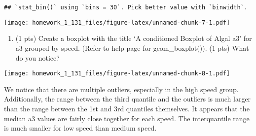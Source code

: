 \documentclass[
]{article}
\newenvironment{Shaded}{\begin{snugshade}}{\end{snugshade}}
\newcommand{\AttributeTok}[1]{\textcolor[rgb]{0.77,0.63,0.00}{#1}}
\newcommand{\CommentTok}[1]{\textcolor[rgb]{0.56,0.35,0.01}{\textit{#1}}}
\newcommand{\FunctionTok}[1]{\textcolor[rgb]{0.00,0.00,0.00}{#1}}
\newcommand{\NormalTok}[1]{#1}
\newcommand{\OtherTok}[1]{\textcolor[rgb]{0.56,0.35,0.01}{#1}}
\newcommand{\SpecialCharTok}[1]{\textcolor[rgb]{0.00,0.00,0.00}{#1}}
\newcommand{\StringTok}[1]{\textcolor[rgb]{0.31,0.60,0.02}{#1}}
\providecommand{\tightlist}{%
  \setlength{\itemsep}{0pt}\setlength{\parskip}{0pt}}
\begin{document}
\begin{verbatim}
## `stat_bin()` using `bins = 30`. Pick better value with `binwidth`.
\end{verbatim}

\texttt{[image: homework\_1\_131\_files/figure-latex/unnamed-chunk-7-1.pdf]}

\begin{enumerate}
\def\labelenumi{\alph{enumi}.}
\setcounter{enumi}{2}
\tightlist
\item
  (1 pts) Create a boxplot with the title `A conditioned Boxplot of
  Algal a3' for a3 grouped by speed. (Refer to help page for
  geom\_boxplot()). (1 pts) What do you notice?
\end{enumerate}

\begin{Shaded}
\end{Shaded}

\texttt{[image: homework\_1\_131\_files/figure-latex/unnamed-chunk-8-1.pdf]}

We notice that there are multiple outliers, especially in the high speed
group. Additionally, the range between the third quantile and the
outliers is much larger than the range between the 1st and 3rd quantiles
themselves. It appears that the median a3 values are fairly close
together for each speed. The interquantile range is much smaller for low
speed than medium speed.
\end{document}

